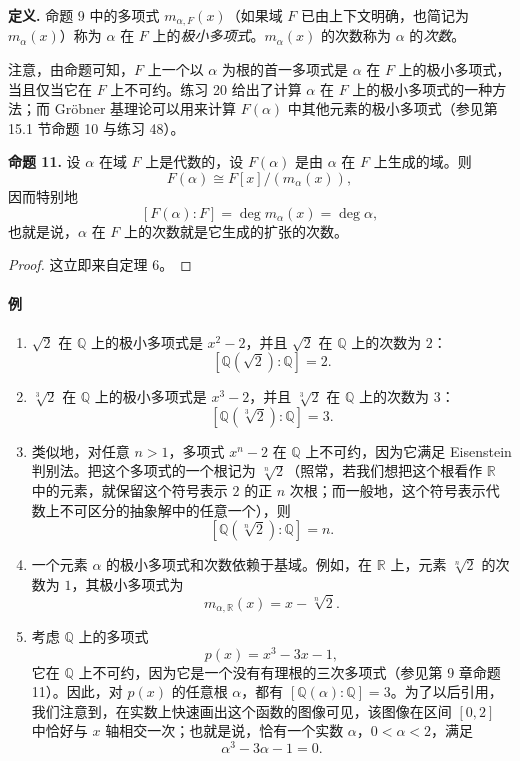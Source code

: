 \noindent\textbf{定义.} 命题 9 中的多项式 $m_{\alpha,F}(x)$（如果域 $F$ 已由上下文明确，也简记为 $m_\alpha(x)$）称为 $\alpha$ 在 $F$ 上的\emph{极小多项式}。$m_\alpha(x)$ 的次数称为 $\alpha$ 的\emph{次数}。

注意，由命题可知，$F$ 上一个以 $\alpha$ 为根的首一多项式是 $\alpha$ 在 $F$ 上的极小多项式，当且仅当它在 $F$ 上不可约。练习 20 给出了计算 $\alpha$ 在 $F$ 上的极小多项式的一种方法；而 Gröbner 基理论可以用来计算 $F(\alpha)$ 中其他元素的极小多项式（参见第 15.1 节命题 10 与练习 48）。

\noindent\textbf{命题 11.} 设 $\alpha$ 在域 $F$ 上是代数的，设 $F(\alpha)$ 是由 $\alpha$ 在 $F$ 上生成的域。则
\[
F(\alpha)\cong F[x]/(m_\alpha(x)),
\]
因而特别地
\[
[F(\alpha):F]=\deg m_\alpha(x)=\deg \alpha,
\]
也就是说，$\alpha$ 在 $F$ 上的次数就是它生成的扩张的次数。

\begin{proof}
	这立即来自定理 6。
\end{proof}

\paragraph{例}
\begin{enumerate}[label=(\arabic*)]
	\item $\sqrt2$ 在 $\mathbb Q$ 上的极小多项式是 $x^2-2$，并且 $\sqrt2$ 在 $\mathbb Q$ 上的次数为 $2$：
	\[
	[\mathbb Q(\sqrt2):\mathbb Q]=2.
	\]
	\item $\sqrt[3]{2}$ 在 $\mathbb Q$ 上的极小多项式是 $x^3-2$，并且 $\sqrt[3]{2}$ 在 $\mathbb Q$ 上的次数为 $3$：
	\[
	[\mathbb Q(\sqrt[3]{2}):\mathbb Q]=3.
	\]
	\item 类似地，对任意 $n>1$，多项式 $x^n-2$ 在 $\mathbb Q$ 上不可约，因为它满足 Eisenstein 判别法。把这个多项式的一个根记为 $\sqrt[n]{2}$（照常，若我们想把这个根看作 $\mathbb R$ 中的元素，就保留这个符号表示 $2$ 的正 $n$ 次根；而一般地，这个符号表示代数上不可区分的抽象解中的任意一个），则
	\[
	[\mathbb Q(\sqrt[n]{2}):\mathbb Q]=n.
	\]
	\item 一个元素 $\alpha$ 的极小多项式和次数依赖于基域。例如，在 $\mathbb R$ 上，元素 $\sqrt[n]{2}$ 的次数为 $1$，其极小多项式为
	\[
	m_{\alpha,\mathbb R}(x)=x-\sqrt[n]{2}.
	\]
	\item 考虑 $\mathbb Q$ 上的多项式
	\[
	p(x)=x^3-3x-1,
	\]
	它在 $\mathbb Q$ 上不可约，因为它是一个没有有理根的三次多项式（参见第 9 章命题 11）。因此，对 $p(x)$ 的任意根 $\alpha$，都有 $[\mathbb Q(\alpha):\mathbb Q]=3$。为了以后引用，我们注意到，在实数上快速画出这个函数的图像可见，该图像在区间 $[0,2]$ 中恰好与 $x$ 轴相交一次；也就是说，恰有一个实数 $\alpha$，$0<\alpha<2$，满足
	\[
	\alpha^3-3\alpha-1=0.
	\]
\end{enumerate}

